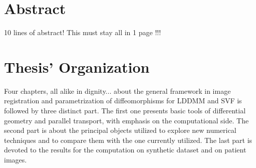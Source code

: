 
\qquad
\pagestyle{empty}
\newpage


\section*{Abstract}


10 lines of abstract! This must stay all in 1 page !!!

\section*{Thesis' Organization}

Four chapters, all alike in dignity... about the general framework in image registration and parametrization of diffeomorphisms for LDDMM and SVF is followed by three distinct part. The first one presents basic tools of differential geometry and parallel transport, with emphasis on the computational side. The second part is about the principal objects utilized to explore new numerical techniques and to compare them with the one currently utilized. The last part is devoted to the results for the computation on synthetic dataset and on patient images. \\

